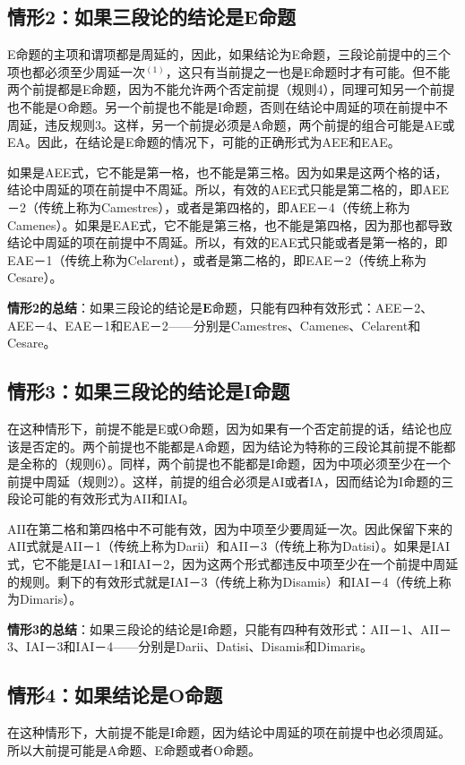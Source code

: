 \subsection{情形2：如果三段论的结论是$\mathbf{E}$命题}
E命题的主项和谓项都是周延的，因此，如果结论为E命题，三段论前提中的三个项也都必须至少周延一次$^{(1)}$，这只有当前提之一也是E命题时才有可能。但不能两个前提都是E命题，因为不能允许两个否定前提（规则4），同理可知另一个前提也不能是O命题。另一个前提也不能是I命题，否则在结论中周延的项在前提中不周延，违反规则3。这样，另一个前提必须是A命题，两个前提的组合可能是AE或EA。因此，在结论是E命题的情况下，可能的正确形式为AEE和EAE。

如果是AEE式，它不能是第一格，也不能是第三格。因为如果是这两个格的话，结论中周延的项在前提中不周延。所以，有效的AEE式只能是第二格的，即AEE－2（传统上称为Camestres），或者是第四格的，即AEE－4（传统上称为Camenes）。如果是EAE式，它不能是第三格，也不能是第四格，因为那也都导致结论中周延的项在前提中不周延。所以，有效的EAE式只能或者是第一格的，即EAE－1（传统上称为Celarent），或者是第二格的，即EAE－2（传统上称为Cesare）。

\textbf{情形2的总结}：如果三段论的结论是$\mathbf{E}$命题，只能有四种有效形式：AEE－2、AEE－4、EAE－1和EAE－2——分别是Camestres、Camenes、Celarent和Cesare。

\subsection{情形3：如果三段论的结论是I命题}
在这种情形下，前提不能是E或O命题，因为如果有一个否定前提的话，结论也应该是否定的。两个前提也不能都是A命题，因为结论为特称的三段论其前提不能都是全称的（规则6）。同样，两个前提也不能都是I命题，因为中项必须至少在一个前提中周延（规则2）。这样，前提的组合必须是AI或者IA，因而结论为I命题的三段论可能的有效形式为AII和IAI。

AII在第二格和第四格中不可能有效，因为中项至少要周延一次。因此保留下来的AII式就是AII－1（传统上称为Darii）和AII－3（传统上称为Datisi）。如果是IAI式，它不能是IAI－1和IAI－2，因为这两个形式都违反中项至少在一个前提中周延的规则。剩下的有效形式就是IAI－3（传统上称为Disamis）和IAI－4（传统上称为Dimaris）。

\textbf{情形3的总结}：如果三段论的结论是I命题，只能有四种有效形式：AII－1、AII－3、IAI－3和IAI－4——分别是Darii、Datisi、Disamis和Dimaris。

\subsection{情形4：如果结论是$\mathbf{O}$命题}
在这种情形下，大前提不能是I命题，因为结论中周延的项在前提中也必须周延。所以大前提可能是A命题、E命题或者O命题。

